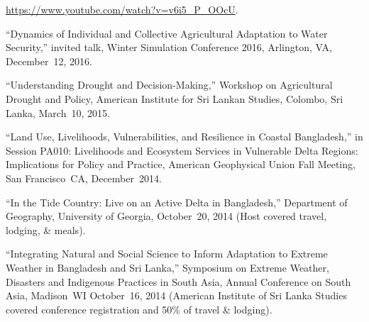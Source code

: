   \url{https://www.youtube.com/watch?v=v6i5_P_OOcU}.
\item  ``Dynamics of Individual and Collective Agricultural Adaptation to Water
  Security,'' invited talk, Winter Simulation Conference 2016, Arlington, VA,
  December~12, 2016.
\item ``Understanding Drought and Decision-Making,'' Workshop on Agricultural
  Drought and Policy, American Institute for Sri Lankan Studies, Colombo, Sri
  Lanka, March~10, 2015.
\item ``Land Use, Livelihoods, Vulnerabilities, and Resilience in Coastal
  Bangladesh,'' in Session PA010: Livelihoods and Ecosystem Services in
  Vulnerable Delta Regions: Implications for Policy and Practice, American
  Geophysical Union Fall Meeting, San Francisco~CA, December~2014.
\item ``In the Tide Country: Live on an Active Delta in Bangladesh,''
  Department of Geography, University of Georgia, October~20, 2014 (Host
  covered travel, lodging, \& meals).
\item ``Integrating Natural and Social Science to Inform Adaptation to Extreme
  Weather in Bangladesh and Sri Lanka,'' Symposium on Extreme Weather,
  Disasters and Indigenous Practices in South Asia, Annual Conference on South
  Asia, Madison~WI October~16, 2014 (American Institute of Sri Lanka Studies
  covered conference registration and 50\% of travel \& lodging).
